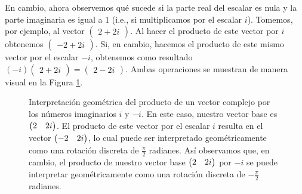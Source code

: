 \documentclass[apuntes]{subfiles}
\begin{document}
En cambio, ahora observemos qué sucede si la parte real del escalar es nula y la parte imaginaria es igual a $1$ (i.e., si multiplicamos por el escalar $i$). Tomemos, por ejemplo, al vector $\begin{pmatrix}2+2i\end{pmatrix}$. Al hacer el producto de este vector por $i$ obtenemos $\begin{pmatrix}-2+2i\end{pmatrix}$. Si, en cambio, hacemos el producto de este mismo vector por el escalar $-i$, obtenemos como resultado $(-i)\begin{pmatrix}2+2i\end{pmatrix}=\begin{pmatrix}2-2i\end{pmatrix}$. Ambas operaciones se muestran de manera visual en la Figura \ref{fig:Producto_de_un_vector_complejo_por_i}.

\begin{figure}[h!]
    \centering
    \caption{Interpretación geométrica del producto de un vector complejo por los números imaginarios $i$ y $-i$. En este caso, nuestro vector base es $\protect\begin{pmatrix} 2 & 2i \protect\end{pmatrix}$. El producto de este vector por el escalar $i$ resulta en el vector $\protect\begin{pmatrix} -2 & 2i \protect\end{pmatrix}$, lo cual puede ser interpretado geométricamente como una rotación discreta de $\frac{\pi}{2}$ radianes. Así observamos que, en cambio, el producto de nuestro vector base $\protect\begin{pmatrix} 2 & 2i \protect\end{pmatrix}$ por $-i$ se puede interpretar geométricamente como una rotación discreta de $-\frac{\pi}{2}$ radianes.}
    \label{fig:Producto_de_un_vector_complejo_por_i}
\end{figure}
\end{document}
